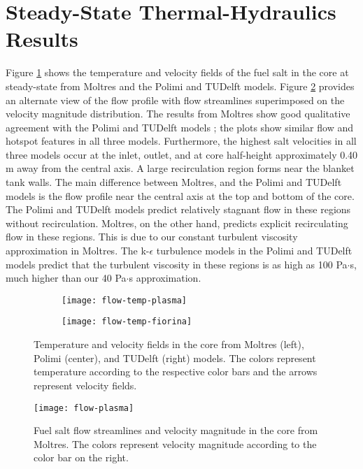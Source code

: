 \section{Steady-State Thermal-Hydraulics Results} \label{sec:ss-th}

Figure \ref{fig:flow-temp} shows the temperature and velocity fields of the
fuel salt in the core at steady-state from Moltres and the Polimi and TUDelft
models. Figure \ref{fig:flow} provides an alternate view of the flow profile
with flow streamlines superimposed on the velocity magnitude distribution.
The results from Moltres show good qualitative agreement with the Polimi and
TUDelft models \cite{fiorina_modelling_2014}; the plots show similar
flow and hotspot features in all three models. Furthermore, the highest salt
velocities in all three models occur at the inlet, outlet, and at core
half-height approximately 0.40 m away from the central axis. A large
recirculation region forms near the blanket tank walls. The main
difference between Moltres, and the Polimi and TUDelft models is the flow
profile near the central axis at the top and bottom of the core.
The Polimi and TUDelft models predict relatively stagnant flow in these
regions without recirculation. Moltres, on the other hand, predicts explicit
recirculating flow in these regions. This is due to our constant turbulent
viscosity approximation in Moltres. The k-$\epsilon$ turbulence models in the
Polimi and TUDelft models predict that the turbulent viscosity in these
regions is as high as 100 Pa$\cdot$s, much higher than our 40 Pa$\cdot$s
approximation.

\begin{figure}[htbp!]
    \centering
    \begin{subfigure}[t]{.35\textwidth}
        \centering
        \texttt{[image: flow-temp-plasma]}
    \end{subfigure}
    \hfill
    \begin{subfigure}[t]{.625\textwidth}
        \centering
        \texttt{[image: flow-temp-fiorina]}
    \end{subfigure}
    \caption{Temperature and velocity fields in the core from Moltres
    (left), Polimi (center), and TUDelft (right) models. The colors represent
    temperature according to the respective color bars and the arrows
    represent velocity fields.}
    \label{fig:flow-temp}
\end{figure}

\begin{figure}[htbp!]
    \centering
    \texttt{[image: flow-plasma]}
    \caption{Fuel salt flow streamlines and velocity magnitude in the core
    from Moltres.
    The colors represent velocity magnitude according to the color bar on the
    right.}
    \label{fig:flow}
\end{figure}


